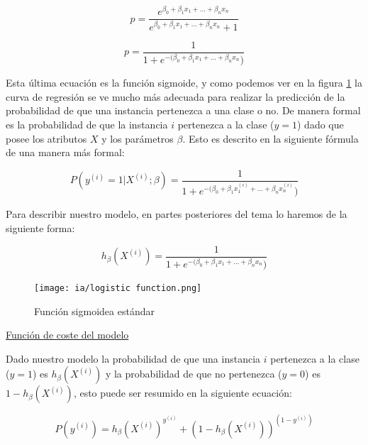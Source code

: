 \documentclass[11pt,fleqn]{book} %
\begin{document}
\begin{equation}
p = \frac{e^{\beta_0 + \beta_1 x_1 + ... + \beta_n x_n}}{e^{\beta_0 + \beta_1 x_1 + ... + \beta_n x_n}+1} 
\label{eqn:suposicion_inicial_mod6} 
\end{equation}

\begin{equation}
p = \frac{1}{1+e^{-(\beta_0 + \beta_1 x_1 + ... + \beta_n x_n})} 
\label{eqn:suposicion_inicial_final} 
\end{equation}

Esta última ecuación es la función sigmoide, y como podemos ver en la figura \ref{fig:sigmoid} la curva de regresión se ve mucho más adecuada para realizar la predicción de la probabilidad de que una instancia pertenezca a una clase o no. De manera formal es la probabilidad de que la instancia $i$ pertenezca a la clase ($y=1$) dado que posee los atributos $X$ y los parámetros $\beta$. Esto es descrito en la siguiente fórmula de una manera más formal:

\begin{equation}
P(y^{(i)}=1 | X^{(i)};\beta) = \frac{1}{1+e^{-(\beta_0 + \beta_1 x^{(i)}_1 + ... + \beta_n x^{(i)}_n})} 
\label{eqn:suposicion_inicial_formalprob} 
\end{equation}

Para describir nuestro modelo, en partes posteriores del tema lo haremos de la siguiente forma:

\begin{equation}
h_\beta(X^{(i)}) = \frac{1}{1+e^{-(\beta_0 + \beta_1 x_1 + ... + \beta_n x_n})} 
\label{eqn:modelo_rl} 
\end{equation}

\begin{figure}[ht]
\centering\texttt{[image: ia/logistic function.png]}
\caption{Función sigmoidea estándar}

\label{fig:sigmoid} 
\end{figure}

\underline{Función de coste del modelo}

Dado nuestro modelo la probabilidad de que una instancia $i$ pertenezca a la clase ($y=1$) es $h_\beta(X^{(i)})$ y la probabilidad de que no pertenezca ($y=0$) es $1-h_\beta(X^{(i)})$, esto puede ser resumido en la siguiente ecuación:

\begin{equation}
P(y^{(i)}) = h_\beta(X^{(i)}) ^ {y^{(i)}} + (1-h_\beta(X^{(i)})) ^ {(1- y^{(i)})}
\label{eqn:probabilidadyrl} 
\end{equation}
\end{document}
